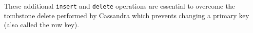 		These additional \texttt{insert} and \texttt{delete} operations are essential
		to overcome the tombstone delete performed by Cassandra which prevents
		changing a primary key (also called the row key).
% 		
		
		
